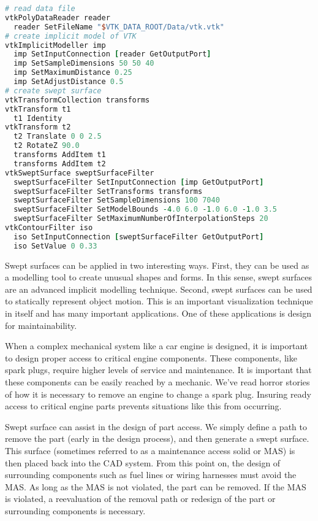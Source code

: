 \begin{lstlisting}[language=TCL, caption={Generating a swept surface.}]
# read data file
vtkPolyDataReader reader
  reader SetFileName "$VTK_DATA_ROOT/Data/vtk.vtk"
# create implicit model of VTK
vtkImplicitModeller imp
  imp SetInputConnection [reader GetOutputPort]
  imp SetSampleDimensions 50 50 40
  imp SetMaximumDistance 0.25
  imp SetAdjustDistance 0.5
# create swept surface
vtkTransformCollection transforms
vtkTransform t1
  t1 Identity
vtkTransform t2
  t2 Translate 0 0 2.5
  t2 RotateZ 90.0
  transforms AddItem t1
  transforms AddItem t2
vtkSweptSurface sweptSurfaceFilter
  sweptSurfaceFilter SetInputConnection [imp GetOutputPort]
  sweptSurfaceFilter SetTransforms transforms
  sweptSurfaceFilter SetSampleDimensions 100 7040
  sweptSurfaceFilter SetModelBounds -4.0 6.0 -1.0 6.0 -1.0 3.5
  sweptSurfaceFilter SetMaximumNumberOfInterpolationSteps 20
vtkContourFilter iso
  iso SetInputConnection [sweptSurfaceFilter GetOutputPort]
  iso SetValue 0 0.33
\end{lstlisting}

Swept surfaces can be applied in two interesting ways. First, they can be used as a modelling tool to create unusual shapes and forms. In this sense, swept surfaces are an advanced implicit modelling technique. Second, swept surfaces can be used to statically represent object motion. This is an important visualization technique in itself and has many important applications. One of these applications is design for maintainability.

When a complex mechanical system like a car engine is designed, it is important to design proper access to critical engine components. These components, like spark plugs, require higher levels of service and maintenance. It is important that these components can be easily reached by a mechanic. We've read horror stories of how it is necessary to remove an engine to change a spark plug. Insuring ready access to critical engine parts prevents situations like this from occurring.

Swept surface can assist in the design of part access. We simply define a path to remove the part (early in the design process), and then generate a swept surface. This surface (sometimes referred to as a maintenance access solid or MAS) is then placed back into the CAD system. From this point on, the design of surrounding components such as fuel lines or wiring harnesses must avoid the MAS. As long as the MAS is not violated, the part can be removed. If the MAS is violated, a reevaluation of the removal path or redesign of the part or surrounding components is necessary.

